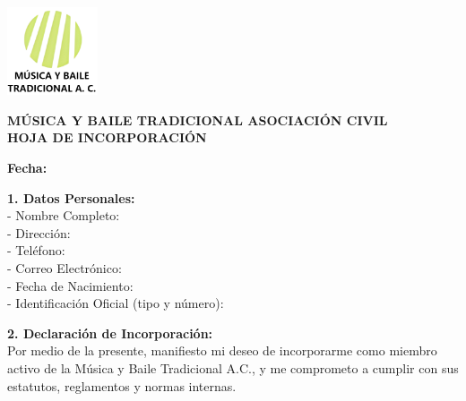 \documentclass[a4paper,12pt]{article}
\begin{document}
\begin{center}
    \includegraphics[width=0.2\textwidth]{logo.png} %
\end{center}

\begin{center}
    \textbf{MÚSICA Y BAILE TRADICIONAL ASOCIACIÓN CIVIL} \\
    \textbf{HOJA DE INCORPORACIÓN}
\end{center}

\vspace{0.5cm}

\begin{flushright}
    \textbf{Fecha:} \underline{\hspace{6cm}} %
\end{flushright}

\vspace{0.5cm}

\noindent
\textbf{1. Datos Personales:} \\
- Nombre Completo: \underline{\hspace{10cm}} \\
- Dirección: \underline{\hspace{10cm}} \\
- Teléfono: \underline{\hspace{10cm}} \\
- Correo Electrónico: \underline{\hspace{10cm}} \\
- Fecha de Nacimiento: \underline{\hspace{10cm}} \\
- Identificación Oficial (tipo y número): \underline{\hspace{10cm}}

\vspace{0.5cm}

\noindent
\textbf{2. Declaración de Incorporación:} \\
Por medio de la presente, manifiesto mi deseo de incorporarme como miembro activo de la Música y Baile Tradicional A.C., y me comprometo a cumplir con sus estatutos, reglamentos y normas internas.
\end{document}
